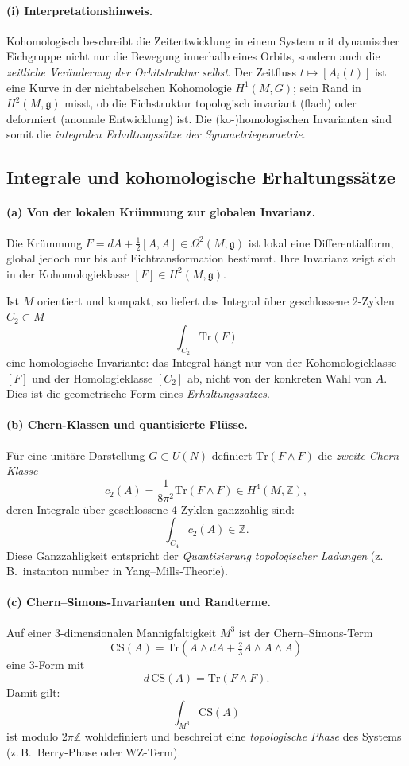 \documentclass[10pt, letterpaper]{article}
\begin{document}
\paragraph{(i) Interpretationshinweis.}
Kohomologisch beschreibt die Zeitentwicklung in einem System mit dynamischer Eichgruppe
nicht nur die Bewegung innerhalb eines Orbits, sondern auch
die \emph{zeitliche Veränderung der Orbitstruktur selbst}.
Der Zeitfluss $t\mapsto [A_t(t)]$ ist eine Kurve in der nichtabelschen
Kohomologie $H^1(M,G)$;
sein Rand in $H^2(M,\mathfrak g)$ misst, ob die
Eichstruktur topologisch invariant (flach) oder deformiert (anomale Entwicklung)
ist.
Die (ko-)homologischen Invarianten sind somit die
\emph{integralen Erhaltungssätze der Symmetriegeometrie}.


\subsection{Integrale und kohomologische Erhaltungssätze}

\paragraph{(a) Von der lokalen Krümmung zur globalen Invarianz.}
Die Krümmung $F=dA+\tfrac12[A,A]\in\Omega^2(M,\mathfrak g)$
ist lokal eine Differentialform, global jedoch
nur bis auf Eichtransformation bestimmt.
Ihre Invarianz zeigt sich in der Kohomologieklasse $[F]\in H^2(M,\mathfrak g)$.

Ist $M$ orientiert und kompakt, so liefert das Integral über
geschlossene 2-Zyklen $C_2\subset M$
\[
\int_{C_2} \mathrm{Tr}(F)
\]
eine homologische Invariante:
das Integral hängt nur von der Kohomologieklasse $[F]$ und der Homologieklasse $[C_2]$
ab, nicht von der konkreten Wahl von $A$.
Dies ist die geometrische Form eines \emph{Erhaltungssatzes}.

\paragraph{(b) Chern-Klassen und quantisierte Flüsse.}
Für eine unitäre Darstellung $G\subset U(N)$
definiert $\mathrm{Tr}(F\wedge F)$ die \emph{zweite Chern-Klasse}
\[
c_2(A)=\frac{1}{8\pi^2}\mathrm{Tr}(F\wedge F)\in H^4(M,\mathbb Z),
\]
deren Integrale über geschlossene 4-Zyklen ganzzahlig sind:
\[
\int_{C_4} c_2(A)\in\mathbb Z.
\]
Diese Ganzzahligkeit entspricht der \emph{Quantisierung topologischer Ladungen}
(z.\,B.\ instanton number in Yang–Mills-Theorie).

\paragraph{(c) Chern–Simons-Invarianten und Randterme.}
Auf einer 3-dimensionalen Mannigfaltigkeit $M^3$
ist der Chern–Simons-Term
\[
\mathrm{CS}(A)=\mathrm{Tr}\!\left(A\wedge dA+\tfrac23A\wedge A\wedge A\right)
\]
eine $3$-Form mit
\[
d\,\mathrm{CS}(A)=\mathrm{Tr}(F\wedge F).
\]
Damit gilt:
\[
\int_{M^3}\mathrm{CS}(A)
\]
ist modulo $2\pi\mathbb Z$ wohldefiniert
und beschreibt eine \emph{topologische Phase} des Systems (z.\,B.\ Berry-Phase oder WZ-Term).
\end{document}
